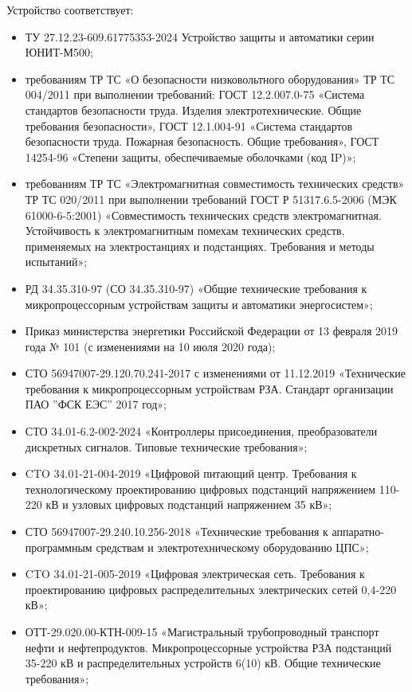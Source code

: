 Устройство соответствует:
\begin{itemize}
	\item ТУ 27.12.23-609.61775353-2024 Устройство защиты и автоматики серии ЮНИТ-М500;
	\item требованиям ТР ТС «О безопасности низковольтного оборудования» ТР ТС 004/2011 при выполнении требований: ГОСТ 12.2.007.0-75 «Система стандартов безопасности труда. Изделия электротехнические. Общие требования безопасности», ГОСТ 12.1.004-91 «Система стандартов безопасности труда. Пожарная безопасность. Общие требования», ГОСТ 14254-96 «Степени защиты, обеспечиваемые оболочками (код IP)»; 
	\item требованиям ТР ТС «Электромагнитная совместимость технических средств» ТР ТС 020/2011 при выполнении требований ГОСТ Р 51317.6.5-2006 (МЭК 61000-6-5:2001) «Совместимость технических средств электромагнитная. Устойчивость к электромагнитным помехам технических средств, применяемых на электростанциях и подстанциях. Требования и методы испытаний»;
	\item РД 34.35.310-97 (СО 34.35.310-97) «Общие технические требования к микропроцессорным устройствам защиты и автоматики энергосистем»;
	\item Приказ министерства энергетики Российской Федерации от 13 февраля 2019 года № 101 (с изменениями на 10 июля 2020 года);
	\item СТО 56947007-29.120.70.241-2017 с изменениями от 11.12.2019 «Технические требования к микропроцессорным устройствам РЗА. Стандарт организации ПАО ''ФСК ЕЭС'' 2017 год»;
	\item СТО 34.01-6.2-002-2024 «Контроллеры присоединения, преобразователи дискретных сигналов. Типовые технические требования»;
	\item CTO 34.01-21-004-2019 «Цифровой питающий центр. Требования к технологическому проектированию цифровых подстанций напряжением 110-220 кВ и узловых цифровых подстанций напряжением 35 кВ»;
	\item СТО 56947007-29.240.10.256-2018 «Технические требования к аппаратно-программным средствам и электротехническому оборудованию ЦПС»;
	\item CTO 34.01-21-005-2019 «Цифровая электрическая сеть. Требования к проектированию цифровых распределительных электрических сетей 0,4-220 кВ»;
	\item \sloppy ОТТ-29.020.00-КТН-009-15 «Магистральный трубопроводный транспорт нефти и нефтепродуктов. Микропроцессорные устройства РЗА подстанций 35-220 кВ и распределительных устройств 6(10) кВ. Общие технические требования»;

\end{itemize}
